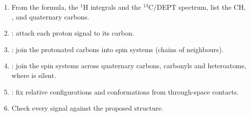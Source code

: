 \begin{method}\label{met:b3:advanced-nmr:solve-2d}
\begin{enumerate}
  \item From the formula, the ${}^1$H integrals and the ${}^{13}$C/DEPT spectrum, list
        the CH, ,  and quaternary carbons.
  \item {}: attach each proton signal to its carbon.
  \item {}: join the protonated carbons into spin systems (chains of
        neighbours).
  \item {}: join the spin systems across quaternary carbons, carbonyls and
        heteroatoms, where  is silent.
  \item {}: fix relative configurations and conformations from
        through-space contacts.
  \item Check every signal against the proposed structure.
\end{enumerate}
\end{method}

